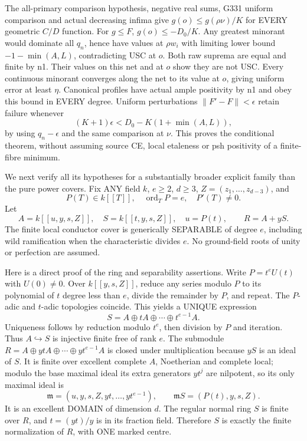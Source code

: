 \documentclass[11pt]{article}
\begin{document}
The all-primary comparison hypothesis, negative real sums, G331 uniform
comparison and actual decreasing infima give
$g(o)\le g(\rho\nu)/K$ for EVERY geometric $C/D$ function.
For $g\le F$, $g(o)\le-D_0/K$.
Any greatest minorant would dominate all $q_n$, hence have values at
$\rho w_i$ with limiting lower bound $-1-\min(A,L)$, contradicting USC
at $o$. Both raw suprema are equal and finite by n1. Their values on this
net and at $o$ show they are not USC. Every continuous minorant converges
along the net to its value at $o$, giving uniform error at least $\eta$.
Canonical profiles have actual ample positivity by n1 and obey this bound
in EVERY degree. Uniform perturbations $\|F'-F\|<\epsilon$ retain failure
whenever
\[
 (K+1)\epsilon<D_0-K(1+\min(A,L)),
\]
by using $q_n-\epsilon$ and the same comparison at $\nu$.
This proves the conditional theorem, without assuming source CE, local
etaleness or psh positivity of a finite-fibre minimum.

We next verify all its hypotheses for a substantially broader explicit
family than the pure power covers. Fix ANY field $k$, $e\ge2$, $d\ge3$,
$Z=(z_1,\ldots,z_{d-3})$, and
\[
 P(T)\in k[[T]],\quad \operatorname{ord}_T P=e,
 \quad P'(T)\ne0.
\]
Let
\[
 A=k[[u,y,s,Z]],\quad S=k[[t,y,s,Z]],\quad u=P(t),
 \qquad R=A+yS.
\]
The finite local conductor cover is generically SEPARABLE of degree $e$,
including wild ramification when the characteristic divides $e$.
No ground-field roots of unity or perfection are assumed.

Here is a direct proof of the ring and separability assertions. Write
$P=t^eU(t)$ with $U(0)\ne0$. Over $k[[y,s,Z]]$, reduce any series modulo
$P$ to its polynomial of $t$ degree less than $e$, divide the remainder
by $P$, and repeat. The $P$-adic and $t$-adic topologies coincide.
This yields a UNIQUE expression
\[
 S=A\oplus tA\oplus\cdots\oplus t^{e-1}A.
\]
Uniqueness follows by reduction modulo $t^e$, then division by $P$ and
iteration. Thus $A\hookrightarrow S$ is injective finite free of rank $e$.
The submodule $R=A\oplus ytA\oplus\cdots\oplus yt^{e-1}A$ is closed
under multiplication because $yS$ is an ideal of $S$. It is finite over
excellent complete $A$, Noetherian and complete local; modulo the base
maximal ideal its extra generators $yt^j$ are nilpotent, so its only
maximal ideal is
\[
 \mathfrak m=(u,y,s,Z,yt,\ldots,yt^{e-1}),\qquad
 \mathfrak mS=(P(t),y,s,Z).
\]
It is an excellent DOMAIN of dimension $d$. The regular normal ring $S$
is finite over $R$, and $t=(yt)/y$ is in its fraction field. Therefore
$S$ is exactly the finite normalization of $R$, with ONE marked centre.
\end{document}
